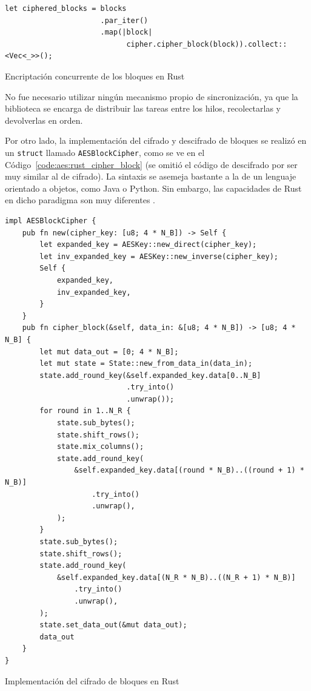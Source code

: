 \documentclass[11pt]{article}
\begin{document}
\begin{listing}[h]
\begin{verbatim}
let ciphered_blocks = blocks
                      .par_iter()
                      .map(|block|
                            cipher.cipher_block(block)).collect::<Vec<_>>();
\end{verbatim}
\caption{Encriptación concurrente de los bloques en Rust}
\label{code:rust:aes_concurrent}
\end{listing}

No fue necesario utilizar ningún mecanismo propio de sincronización, ya que la biblioteca se encarga de distribuir las tareas entre los hilos, recolectarlas y devolverlas en orden.

Por otro lado, la implementación del cifrado y descifrado de bloques se realizó en un \lstinline{struct} llamado \lstinline{AESBlockCipher}, como se ve en el Código~\ref{code:aes:rust_cipher_block} (se omitió el código de descifrado por ser muy similar al de cifrado). La sintaxis se asemeja bastante a la de un lenguaje orientado a objetos, como Java o Python. Sin embargo, las capacidades de Rust en dicho paradigma son muy diferentes \cite{aes:rust_oop}.

\begin{listing}[h]
\begin{verbatim}
impl AESBlockCipher {
    pub fn new(cipher_key: [u8; 4 * N_B]) -> Self {
        let expanded_key = AESKey::new_direct(cipher_key);
        let inv_expanded_key = AESKey::new_inverse(cipher_key);
        Self {
            expanded_key,
            inv_expanded_key,
        }
    }
    pub fn cipher_block(&self, data_in: &[u8; 4 * N_B]) -> [u8; 4 * N_B] {
        let mut data_out = [0; 4 * N_B];
        let mut state = State::new_from_data_in(data_in);
        state.add_round_key(&self.expanded_key.data[0..N_B]
                            .try_into()
                            .unwrap());
        for round in 1..N_R {
            state.sub_bytes();
            state.shift_rows();
            state.mix_columns();
            state.add_round_key(
                &self.expanded_key.data[(round * N_B)..((round + 1) * N_B)]
                    .try_into()
                    .unwrap(),
            );
        }
        state.sub_bytes();
        state.shift_rows();
        state.add_round_key(
            &self.expanded_key.data[(N_R * N_B)..((N_R + 1) * N_B)]
                .try_into()
                .unwrap(),
        );
        state.set_data_out(&mut data_out);
        data_out
    }
}
\end{verbatim}
\caption{Implementación del cifrado de bloques en Rust}
\label{code:aes:rust_cipher_block}
\end{listing}
\end{document}
